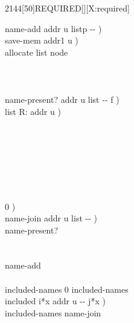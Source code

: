 \begin{worddef}{2144}[50]{REQUIRED}[][X:required]
\begin{implement}
		\word{:} name-add  addr u listp -{}- ) \\
		\tab {} save-mem  addr1 u ) \\
		     allocate list node \\
		\tab {}   \word{!}   \\
		\tab {}  \word{!}   \\
		\tab {}  \word{;} \\

		\word{:} name-present?  addr u list -{}- f ) \\
		\tab \word{ROT}     list R: addr u ) \\
		\tab[2]  \\
		\tab {} \\
		\tab[2]        \\
		\tab[3]		     \\
		\tab[2]	 \\
		\tab[2]  \\
		\tab {} \\
		\tab {}  0 )   \word{;} \\

		\word{:} name-join  addr u list -{}- ) \\
		\tab {}    name-present?  \\
		\tab[2]    \\
	    \tab {} \\
		\tab[2]  name-add \\
		\tab {} \word{;} \\

		 included-names 0 included-names \word{!} \\

		\word{:} included  i*x addr u -{}- j*x ) \\
		\tab {} included-names name-join \\
		\tab {} \word{;} \\


\end{implement}
\end{worddef}

